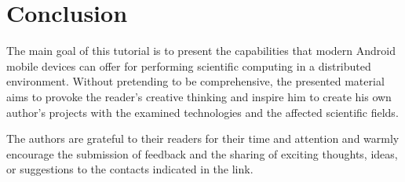 \newpage
{}
\chapter*{Conclusion}

The main goal of this tutorial is to present the capabilities that modern Android mobile devices can offer for performing scientific computing in a distributed environment. Without pretending to be comprehensive, the presented material aims to provoke the reader's creative thinking and inspire him to create his own author's projects with the examined technologies and the affected scientific fields.

The authors are grateful to their readers for their time and attention and warmly encourage the submission of feedback and the sharing of exciting thoughts, ideas, or suggestions to the contacts indicated in the link.
